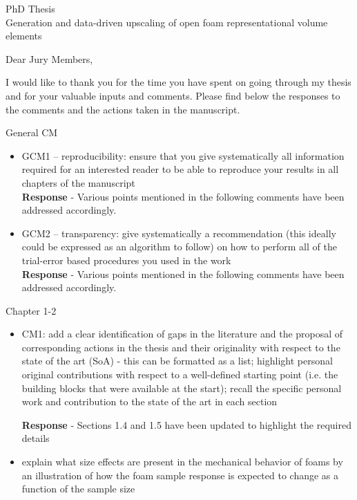 \documentclass[12pt]{letter}
\begin{document}
\begin{letter}{PhD Thesis\\
Generation and data-driven upscaling of open foam representational volume elements}

\address{Jury Members}

\opening{Dear Jury Members,}

I would like to thank you for the time you have spent on going through my thesis and for your valuable inputs and comments. Please find below the responses to the comments and the actions taken in the manuscript.
\vspace{12pt}

General CM
\begin{itemize}
\item GCM1 – reproducibility: ensure that you give systematically all information
required for an interested reader to be able to reproduce your results in all chapters
of the manuscript
\\\textbf{Response} - Various points mentioned in the following comments have been addressed accordingly.

\item GCM2 – transparency: give systematically a recommendation (this ideally could be
expressed as an algorithm to follow) on how to perform all of the trial-error based
procedures you used in the work
\\\textbf{Response} - Various points mentioned in the following comments have been addressed accordingly.
\end{itemize}

Chapter 1-2

\begin{itemize}
\item CM1: add a clear identification of gaps in the literature and the proposal of
corresponding actions in the thesis and their originality with respect to the state of
the art (SoA) - this can be formatted as a list; highlight personal original
contributions with respect to a well-defined starting point (i.e. the building blocks
that were available at the start); recall the specific personal work and contribution to
the state of the art in each section

\textbf{Response} - Sections 1.4 and 1.5 have been updated to highlight the required details

\item explain what size effects are present in the mechanical behavior of foams by an
illustration of how the foam sample response is expected to change as a function of
the sample size


\end{itemize}
\end{letter}
\end{document}
